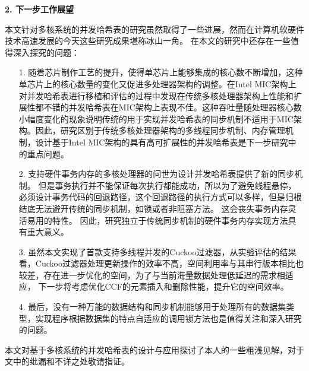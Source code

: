 \begin{summary}
\textbf{2. 下一步工作展望}

本文针对多核系统的并发哈希表的研究虽然取得了一些进展，然而在计算机软硬件技术高速发展的今天这些研究成果堪称冰山一角。
在本文的研究中还存在一些值得深入探究的问题：
\begin{itemize}
\item[1.] 随着芯片制作工艺的提升，使得单芯片上能够集成的核心数不断增加，这种单芯片上的核心数量的变化又促进多处理器架构的调整。在Intel MIC架构上对并发哈希表进行移植和评估的过程中发现在传统多核处理器架构上性能和扩展性都不错的并发哈希表在MIC架构上表现不佳。这种吞吐量随处理器核心数小幅度变化的现象说明传统的用于实现并发哈希表的同步机制不适用于MIC架构。因此，研究区别于传统多核处理器架构的多线程同步机制、内存管理机制，设计基于Intel MIC架构的具有高可扩展性的并发哈希表是下一步研究中的重点问题。
\item[2.] 支持硬件事务内存的多核处理器的问世为设计并发哈希表提供了新的同步机制。
但是事务执行并不能保证每次执行都能成功，所以为了避免线程悬停，必须设计事务代码的回退路径，这个回退路径的执行方式可以多样，但是归根结底无法避开传统的同步机制，如锁或者非阻塞方法。
这会丧失事务内存灵活易用的特性。
因此，研究独立于传统同步机制的硬件事务内存实现方法具有重大意义。
\item[3.] 虽然本文实现了首款支持多线程并发的Cuckoo过滤器，从实验评估的结果看，Cuckoo过滤器处理更新操作的效率不高，空间利用率与其串行版本相比也较差，存在进一步优化的空间，为了与当前海量数据处理低延迟的需求相适应，
下一步将考虑优化CCF的元素插入和删除性能，提升它的空间效率。
\item[4.] 最后，没有一种万能的数据结构和同步机制能够用于处理所有的数据集类型，实现程序根据数据集的特点自适应的调用锁方法也是值得关注和深入研究的问题。
\end{itemize}

本文对基于多核系统的并发哈希表的设计与应用探讨了本人的一些粗浅见解，对于文中的纰漏和不详之处敬请指证。
\end{summary}